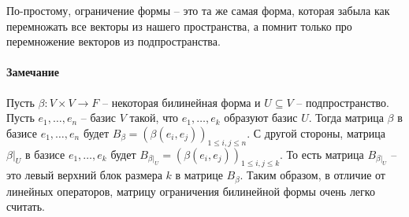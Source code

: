 По-простому, ограничение формы -- это та же самая форма, которая забыла как перемножать все векторы из нашего пространства, а помнит только про перемножение векторов из подпространства.

\paragraph{Замечание}

Пусть $\beta\colon V\times V\to F$ -- некоторая билинейная форма и $U\subseteq V$ -- подпространство.
Пусть $e_1,\ldots,e_n$ -- базис $V$ такой, что $e_1,\ldots,e_k$ образуют базис $U$.
Тогда матрица $\beta$ в базисе $e_1,\ldots,e_n$ будет $B_{\beta} = (\beta(e_i, e_j))_{1\leqslant i,j \leqslant n}$.
С другой стороны, матрица $\beta|_U$ в базисе $e_1,\ldots,e_k$ будет $B_{\beta|_U} = (\beta(e_i, e_j))_{1\leqslant i,j \leqslant k}$.
То есть матрица $B_{\beta|_U}$ -- это левый верхний блок размера $k$ в матрице $B_{\beta}$.
Таким образом, в отличие от линейных операторов, матрицу ограничения  билинейной формы очень легко считать.

